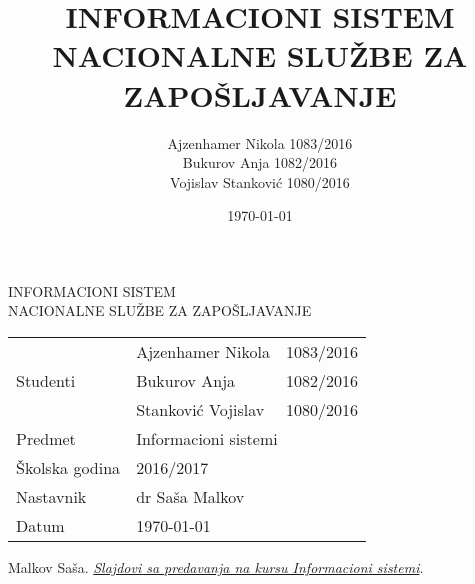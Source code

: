 \documentclass[a4paper, 12pt]{article}
\author{Ajzenhamer Nikola 1083/2016\\Bukurov Anja 1082/2016\\Vojislav Stankovi\'c 1080/2016}
\title{INFORMACIONI SISTEM NACIONALNE SLU\v ZBE ZA ZAPO\v SLJAVANJE}
\date{\today}
\begin{document}
\begin{titlepage}
	\centering
	
	\vspace{0.3\textheight}
	
	{\Huge INFORMACIONI SISTEM\\NACIONALNE SLU\v ZBE ZA ZAPO\v SLJAVANJE}
	
	\vfill
	
	{
		\Large 
		\begin{tabular}{|l|l|l|}
			\hline
			\multirow{3}{*}{Studenti} & Ajzenhamer Nikola     & 1083/2016\\ \cline{2-3}
			                          & Bukurov Anja          & 1082/2016\\ \cline{2-3}
			                          & Stankovi\' c Vojislav & 1080/2016\\
			\hline
			Predmet                   & \multicolumn{2}{l|}{Informacioni sistemi}\\
			\hline
			\v Skolska godina         & \multicolumn{2}{l|}{2016/2017}\\
			\hline
			Nastavnik                 & \multicolumn{2}{l|}{dr Sa\v sa Malkov}\\
			\hline
			Datum                     & \multicolumn{2}{l|}{\today}\\
			\hline
		\end{tabular}
	}
\end{titlepage}
\newpage
\tableofcontents
\newpage










\thispagestyle{empty}
\begin{thebibliography}{9}
	
	Malkov Sa\v sa.
	\href{http://poincare.matf.bg.ac.rs/~smalkov/nastava.master.html\#r271\_is}{\textit{Slajdovi sa predavanja na kursu Informacioni sistemi}}.
	
\end{thebibliography}
\end{document}
